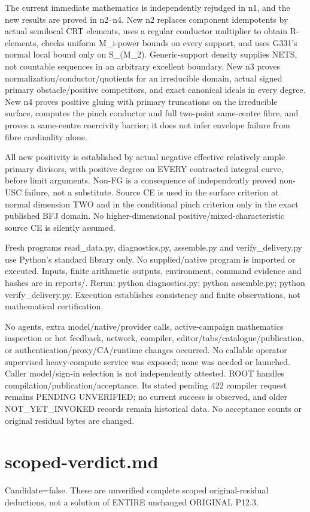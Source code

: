 \documentclass[11pt]{article}
\begin{document}
The current immediate mathematics is independently rejudged in n1, and the new results are proved in n2--n4. New n2 replaces component idempotents by actual semilocal CRT elements, uses a regular conductor multiplier to obtain R-elements, checks uniform M\_i-power bounds on every support, and uses G331's normal local bound only on S\_(M\_2). Generic-support density supplies NETS, not countable sequences in an arbitrary excellent boundary. New n3 proves normalization/conductor/quotients for an irreducible domain, actual signed primary obstacle/positive competitors, and exact canonical ideals in every degree. New n4 proves positive gluing with primary truncations on the irreducible surface, computes the pinch conductor and full two-point same-centre fibre, and proves a same-centre coercivity barrier; it does not infer envelope failure from fibre cardinality alone.

All new positivity is established by actual negative effective relatively ample primary divisors, with positive degree on EVERY contracted integral curve, before limit arguments. Non-FG is a consequence of independently proved non-USC failure, not a substitute. Source CE is used in the surface criterion at normal dimension TWO and in the conditional pinch criterion only in the exact published BFJ domain. No higher-dimensional positive/mixed-characteristic source CE is silently assumed.

Fresh programs read\_data.py, diagnostics.py, assemble.py and verify\_delivery.py use Python's standard library only. No supplied/native program is imported or executed. Inputs, finite arithmetic outputs, environment, command evidence and hashes are in reports/. Rerun: python diagnostics.py; python assemble.py; python verify\_delivery.py. Execution establishes consistency and finite observations, not mathematical certification.

No agents, extra model/native/provider calls, active-campaign mathematics inspection or hot feedback, network, compiler, editor/tabs/catalogue/publication, or authentication/proxy/CA/runtime changes occurred. No callable operator supervised heavy-compute service was exposed; none was needed or launched. Caller model/sign-in selection is not independently attested. ROOT handles compilation/publication/acceptance. Its stated pending 422 compiler request remains PENDING UNVERIFIED; no current success is observed, and older NOT\_YET\_INVOKED records remain historical data. No acceptance counts or original residual bytes are changed.

\section*{scoped-verdict.md}
Candidate=false. These are unverified complete scoped original-residual deductions, not a solution of ENTIRE unchanged ORIGINAL P12.3.
\end{document}
